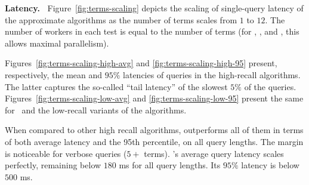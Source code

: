 {{{\bf Latency.\ } 
Figure~\ref{fig:terms-scaling} depicts the scaling of single-query latency of the approximate algorithms  
as the number of terms scales from $1$ to $12$. The number of workers in each test 
is equal to the number of terms (for \alg, \pRA, and \pNRA, this allows maximal parallelism). 

Figures~\ref{fig:terms-scaling-high-avg} and \ref{fig:terms-scaling-high-95} present, respectively, the  mean and  
$95\%$ latencies of queries in the high-recall algorithms. The latter captures the so-called ``tail latency'' of 
the slowest $5\%$ of the queries. Figures~\ref{fig:terms-scaling-low-avg} and \ref{fig:terms-scaling-low-95} present the same for \alg\hi\ and the low-recall variants of the algorithms.

%
When compared to other high recall algorithms, \alg\/ outperforms all of them in terms of both average latency and the 95th percentile, on all query lengths.
The margin is noticeable for verbose queries
($5+$ terms). \alg's average query latency scales perfectly, 
remaining below $180$ ms for all query lengths.
Its  $95\%$ latency is below $500$ ms. 


}}
